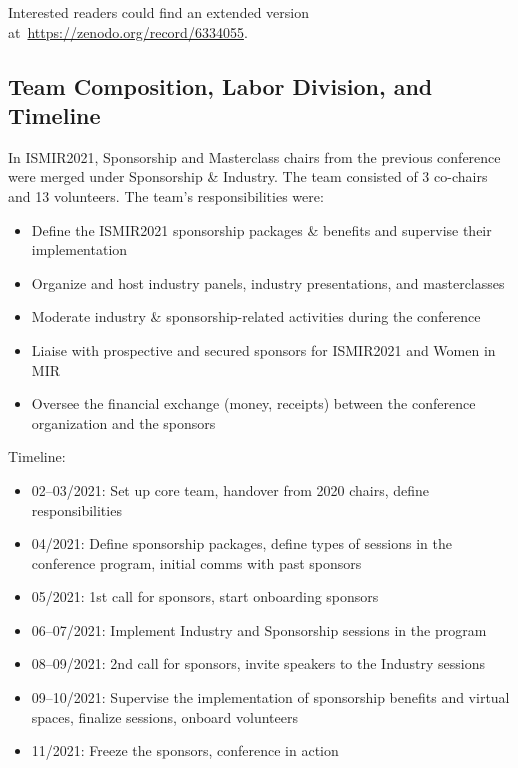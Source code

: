 \documentclass[%
10pt,								%
titlepage,						%
]
{scrartcl}
\begin{document}
    Interested readers could find an extended version at~\href{https://zenodo.org/record/6334055}{https://zenodo.org/record/6334055}.
    
    \subsection{Team Composition, Labor Division, and Timeline}
        In ISMIR2021, Sponsorship and Masterclass chairs from the previous conference were merged under Sponsorship \& Industry. The team consisted of 3 co-chairs and 13 volunteers. The team's responsibilities were:
        \begin{itemize}
            \item Define the ISMIR2021 sponsorship packages \& benefits and supervise their implementation
            \item Organize and host industry panels, industry presentations, and masterclasses
            \item Moderate industry \& sponsorship-related activities during the conference
            \item Liaise with prospective and secured sponsors for ISMIR2021 and Women in MIR
            \item Oversee the financial exchange (money, receipts) between the conference organization and the sponsors
        \end{itemize}
        Timeline:
        \begin{itemize}
            \item 02--03/2021: Set up core team, handover from 2020 chairs, define responsibilities
            \item 04/2021: Define sponsorship packages, define types of sessions in the conference program, initial comms with past sponsors
            \item 05/2021: 1st call for sponsors, start onboarding sponsors
            \item 06--07/2021: Implement Industry and Sponsorship sessions in the program
            \item 08--09/2021: 2nd call for sponsors, invite speakers to the Industry sessions 
            \item 09--10/2021: Supervise the implementation of sponsorship benefits and virtual spaces, finalize sessions, onboard volunteers
            \item 11/2021: Freeze the sponsors, conference in action 
        \end{itemize}
        
\end{document}
